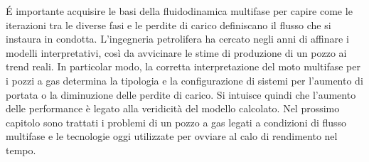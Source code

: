 \'E importante acquisire le basi della fluidodinamica multifase per capire come le iterazioni tra le diverse fasi e le perdite di carico definiscano il flusso che si instaura in condotta. L'ingegneria petrolifera ha cercato negli anni di affinare i modelli interpretativi, così da avvicinare le stime di produzione di un pozzo ai trend reali. In particolar modo, la corretta interpretazione del moto multifase per i pozzi a gas determina la tipologia e la configurazione di sistemi per l'aumento di portata o la diminuzione delle perdite di carico. Si intuisce quindi che l'aumento delle performance è legato alla veridicità del modello calcolato. Nel prossimo capitolo sono trattati i problemi di un pozzo a gas legati a condizioni di flusso multifase e le tecnologie oggi utilizzate per ovviare al calo di rendimento nel tempo.

